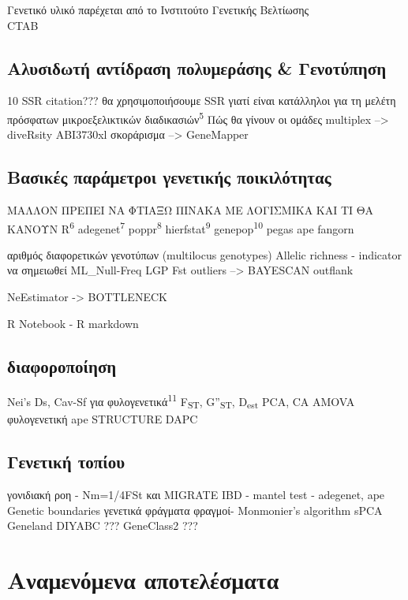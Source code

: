 \documentclass[12pt,a4paper,]{report}
\begin{document}
Γενετικό υλικό παρέχεται από το Ινστιτούτο Γενετικής Βελτίωσης\\
CTAB

\hypertarget{---}{%
\subsection{Αλυσιδωτή αντίδραση πολυμεράσης \& Γενοτύπηση}\label{---}}

10 SSR citation??? θα χρησιμοποιήσουμε SSR γιατί είναι κατάλληλοι για τη
μελέτη πρόσφατων μικροεξελικτικών διαδικασιών\textsuperscript{5} Πώς θα
γίνουν οι ομάδες multiplex --\textgreater{} diveRsity ABI3730xl
σκοράρισμα --\textgreater{} GeneMapper

\hypertarget{---}{%
\subsection{Βασικές παράμετροι γενετικής ποικιλότητας}\label{---}}

ΜΑΛΛΟΝ ΠΡΕΠΕΙ ΝΑ ΦΤΙΑΞΩ ΠΙΝΑΚΑ ΜΕ ΛΟΓΙΣΜΙΚΑ ΚΑΙ ΤΙ ΘΑ ΚΑΝΟΥΝ
R\textsuperscript{6} adegenet\textsuperscript{7}
poppr\textsuperscript{8} hierfstat\textsuperscript{9}
genepop\textsuperscript{10} pegas ape fangorn

αριθμός διαφορετικών γενοτύπων (multilocus genotypes) Allelic richness -
indicator να σημειωθεί ML\_Null-Freq LGP Fst outliers --\textgreater{}
BAYESCAN outflank

NeEstimator -\textgreater{} BOTTLENECK

R Notebook - R markdown

\subsection{διαφοροποίηση}

Nei's Ds, Cav-Sf για φυλογενετικά\textsuperscript{11}
F\textsubscript{ST}, G''\textsubscript{ST}, D\textsubscript{est} PCA, CA
AMOVA φυλογενετική ape STRUCTURE DAPC

\hypertarget{-}{%
\subsection{Γενετική τοπίου}\label{-}}

γονιδιακή ροη - Nm=1/4FSt και MIGRATE IBD - mantel test - adegenet, ape
Genetic boundaries γενετικά φράγματα φραγμοί- Monmonier's algorithm sPCA
Geneland DIYABC ??? GeneClass2 ???

\hypertarget{-}{%
\section{Αναμενόμενα αποτελέσματα}\label{-}}
\end{document}
